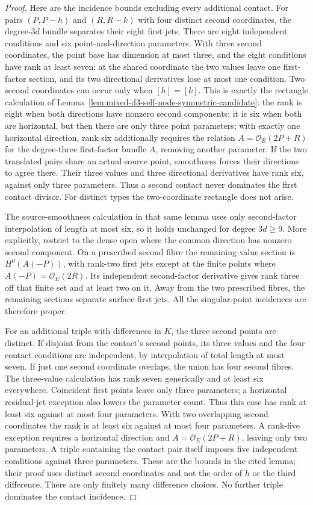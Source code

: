 \begin{proof}
Here are the incidence bounds excluding every additional contact.
For pairs $(P,P-h)$ and $(R,R-k)$ with four distinct second
coordinates, the degree-$3d$ bundle separates their eight first
jets. There are eight independent conditions and six
point-and-direction parameters. With three second coordinates,
the point base has dimension at most three, and the eight
conditions have rank at least seven: at the shared coordinate
the two values leave one first-factor section, and its two
directional derivatives lose at most one condition. Two second
coordinates can occur only when $[h]=[k]$. This is exactly the
rectangle calculation of
Lemma~\ref{lem:mixed-d3-self-node-symmetric-candidate}:
the rank is eight when both directions have nonzero second
components; it is six when both are horizontal, but then there
are only three point parameters; with exactly one horizontal
direction, rank six additionally requires the relation
$A=\mathcal O_E(2P+R)$ for the degree-three first-factor bundle
$A$, removing another parameter. If the two translated pairs
share an actual source point, smoothness forces their directions
to agree there. Their three values and three directional
derivatives have rank six, against only three parameters.
Thus a second contact never dominates the first contact divisor.
For distinct types the two-coordinate rectangle does not arise.

The source-smoothness calculation in that same lemma uses only
second-factor interpolation of length at most six, so it holds
unchanged for degree $3d\geq9$. More explicitly, restrict to the
dense open where the common direction has nonzero second
component. On a prescribed second fibre the remaining value
section is $H^0(A(-P))$, with rank-two first jets except at the
finite points where $A(-P)=\mathcal O_E(2R)$. Its independent
second-factor derivative gives rank three off that finite set
and at least two on it. Away from the two prescribed fibres,
the remaining sections separate surface first jets. All the
singular-point incidences are therefore proper.

For an additional triple with differences in $K$, the three
second points are distinct. If disjoint from the contact's second
points, its three values and the four contact conditions are
independent, by interpolation of total length at most seven.
If just one second coordinate overlaps, the union has four
second fibres. The three-value calculation has rank seven
generically and at least six everywhere. Coincident first
points leave only three parameters; a horizontal residual-jet
exception also lowers the parameter count. Thus this case has
rank at least six against at most four parameters.
With two overlapping second coordinates the rank is at least
six against at most four parameters. A rank-five exception
requires a horizontal direction and $A=\mathcal O_E(2P+R)$,
leaving only two parameters. A triple containing the contact
pair itself imposes five independent conditions against three
parameters. These are the bounds in the cited lemma; their proof
uses distinct second coordinates and not the order of $h$ or
the third difference. There are only finitely many difference
choices. No further triple dominates the contact incidence.


\end{proof}
